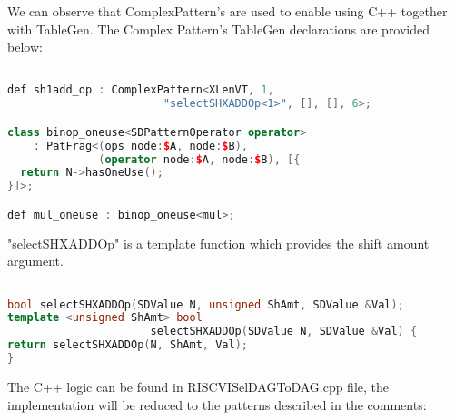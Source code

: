 We can observe that ComplexPattern's  are used to enable using C++ together with TableGen. The Complex Pattern's TableGen declarations are provided below:

\begin{minipage}{\linewidth}
\begin{lstlisting}[language=C++, caption={TableGen Declaration of ComplexPatterns}]

def sh1add_op : ComplexPattern<XLenVT, 1, 
                        "selectSHXADDOp<1>", [], [], 6>;

class binop_oneuse<SDPatternOperator operator>
    : PatFrag<(ops node:$A, node:$B),
              (operator node:$A, node:$B), [{
  return N->hasOneUse();
}]>;

def mul_oneuse : binop_oneuse<mul>;
\end{lstlisting}
\end{minipage}

"selectSHXADDOp" is a template function which provides the shift amount argument.

\begin{lstlisting}[language=C++, caption={Template Function of the ComplexPattern for "sh1add\_op"}]

bool selectSHXADDOp(SDValue N, unsigned ShAmt, SDValue &Val);
template <unsigned ShAmt> bool 
                      selectSHXADDOp(SDValue N, SDValue &Val) {
return selectSHXADDOp(N, ShAmt, Val);
}
\end{lstlisting}

The C++ logic can be found in RISCVISelDAGToDAG.cpp file, the implementation will be reduced to the patterns described in the comments:

